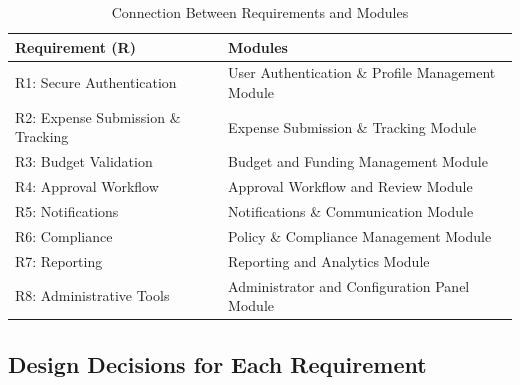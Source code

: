 \documentclass[12pt, titlepage]{article}
\begin{document}
\begin{table}[h!]
\centering
\caption{Connection Between Requirements and Modules}
\label{tab:req-to-modules}
\begin{tabular}{|p{4cm}|p{8cm}|}
\hline
\textbf{Requirement (R)} & \textbf{Modules} \\
\hline
R1: Secure Authentication & User Authentication \& Profile Management Module \\
\hline
R2: Expense Submission \& Tracking & Expense Submission \& Tracking Module \\
\hline
R3: Budget Validation & Budget and Funding Management Module \\
\hline
R4: Approval Workflow & Approval Workflow and Review Module \\
\hline
R5: Notifications & Notifications \& Communication Module \\
\hline
R6: Compliance & Policy \& Compliance Management Module \\
\hline
R7: Reporting & Reporting and Analytics Module \\
\hline
R8: Administrative Tools & Administrator and Configuration Panel Module \\
\hline
\end{tabular}
\end{table}

\subsection{Design Decisions for Each Requirement}
\end{document}
